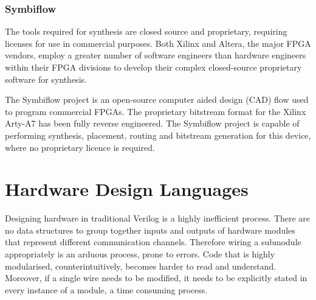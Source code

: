 \documentclass[a4paper,8pt]{report}
\begin{document}
\subsubsection{Symbiflow}
The tools required for synthesis are closed source and proprietary, requiring
licenses for use in commercial purposes. Both Xilinx and Altera, the major FPGA
vendors, employ a greater number of software engineers than hardware engineers
within their FPGA divisions to develop their complex closed-source proprietary
software for synthesis.

The Symbiflow project is an open-source computer aided design (CAD) flow used to
program commercial FPGAs. The proprietary bitstream format for the Xilinx
Arty-A7 has been fully reverse engineered.
The Symbiflow project is capable of performing synthesis, placement, routing
and bitstream generation for this device, where no proprietary licence is required. 

\section{Hardware Design Languages}
Designing hardware in traditional Verilog is a highly inefficient process. There
are no data structures to group together inputs and outputs of hardware modules
that represent different communication channels. Therefore wiring a submodule
appropriately is an arduous process, prone to errors. Code that is highly
modularised, counterintuitively, becomes harder to read and understand.
Moreover, if a single wire needs to be modified, it needs to be explicitly
stated in every instance of a module, a time consuming process.
\end{document}
